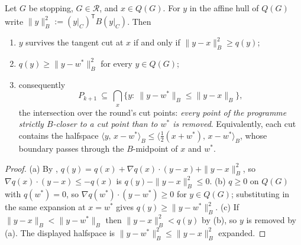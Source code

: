 \begin{proposition}\label{hz:bisector}
Let $G$ be stopping, $G\in\mathcal R$, and $x\in Q(G)$. For $y$ in the affine
hull of $Q(G)$ write $\|y\|_B^{2}:=(y|_C)^{\mathsf T}B(y|_C)$. Then
\begin{enumerate}[label=\textup{(\alph*)},leftmargin=2.2em]
\item $y$ survives the tangent cut at $x$ if and only if
      $\|y-x\|_B^{2}\ge q(y)$;
\item $q(y)\ge\|y-w^\ast\|_B^{2}$ for every $y\in Q(G)$;
\item consequently
      \[
        P_{k+1}\ \subseteq\ \bigcap_{x}\bigl\{y:\ \|y-w^\ast\|_B\le\|y-x\|_B\bigr\},
      \]
      the intersection over the round's cut points: \emph{every point of the
      programme strictly $B$-closer to a cut point than to $w^{\ast}$ is
      removed}. Equivalently, each cut contains the halfspace
      $\bigl\langle y,\,x-w^\ast\bigr\rangle_B\le\bigl\langle\tfrac12(x+w^\ast),\,x-w^\ast\bigr\rangle_B$,
      whose boundary passes through the $B$-midpoint of $x$ and $w^{\ast}$.
\end{enumerate}
\end{proposition}

\begin{proof}
(a) By , $q(y)=q(x)+\nabla q(x)\cdot(y-x)+\|y-x\|_B^{2}$, so
$\nabla q(x)\cdot(y-x)\le-q(x)$ is $q(y)-\|y-x\|_B^{2}\le0$.
(b) $q\ge0$ on $Q(G)$ with $q(w^\ast)=0$, so $\nabla q(w^\ast)\cdot(y-w^\ast)\ge0$
for $y\in Q(G)$; substituting in the same expansion at $x=w^\ast$ gives
$q(y)\ge\|y-w^\ast\|_B^{2}$.
(c) If $\|y-x\|_B<\|y-w^\ast\|_B$ then $\|y-x\|_B^{2}<q(y)$ by (b), so $y$ is
removed by (a). The displayed halfspace is
$\|y-w^\ast\|_B^{2}\le\|y-x\|_B^{2}$ expanded.
\end{proof}

